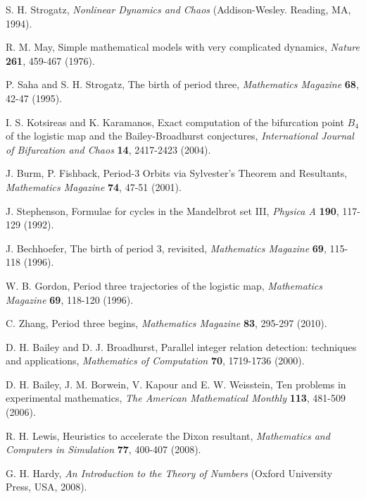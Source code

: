 \documentclass[twocolumn]{revtex4-1}
\begin{document}
\begin{thebibliography}{50}


 S. H. Strogatz,
  \textit{Nonlinear Dynamics and Chaos}
  (Addison-Wesley. Reading, MA, 1994).

 R. M. May,
  Simple mathematical models with very complicated dynamics,
  \textit{Nature}
  \textbf{261},
  459-467
  (1976).

 P. Saha and S. H. Strogatz,
  The birth of period three,
  \textit{Mathematics Magazine}
  \textbf{68},
  42-47
  (1995).

 I. S. Kotsireas and K. Karamanos,
  Exact computation of the bifurcation point $B_4$ of the logistic map and
    the Bailey-Broadhurst conjectures,
  \textit{International Journal of Bifurcation and Chaos}
  \textbf{14},
  2417-2423
  (2004).

 J. Burm, P. Fishback,
  Period-3 Orbits via Sylvester's Theorem and Resultants,
  \textit{Mathematics Magazine}
  \textbf{74},
  47-51
  (2001).

 J. Stephenson,
  Formulae for cycles in the Mandelbrot set III,
  \textit{Physica A}
  \textbf{190},
  117-129
  (1992).

 J. Bechhoefer,
  The birth of period 3, revisited,
  \textit{Mathematics Magazine}
  \textbf{69},
  115-118
  (1996).

 W. B. Gordon,
  Period three trajectories of the logistic map,
  \textit{Mathematics Magazine}
  \textbf{69},
  118-120
  (1996).

 C. Zhang,
  Period three begins,
  \textit{Mathematics Magazine}
  \textbf{83},
  295-297
  (2010).

 D. H. Bailey and D. J. Broadhurst,
  Parallel integer relation detection: techniques and applications,
  \textit{Mathematics of Computation}
  \textbf{70},
  1719-1736
  (2000).

 D. H. Bailey, J. M. Borwein, V. Kapour and E. W. Weisstein,
  Ten problems in experimental mathematics,
  \textit{The American Mathematical Monthly}
  \textbf{113},
  481-509
  (2006).

 R. H. Lewis,
  Heuristics to accelerate the Dixon resultant,
  \textit{Mathematics and Computers in Simulation}
  \textbf{77},
  400-407
  (2008).

 G. H. Hardy,
  \textit{An Introduction to the Theory of Numbers}
  (Oxford University Press, USA, 2008).


\end{thebibliography}
\end{document}
